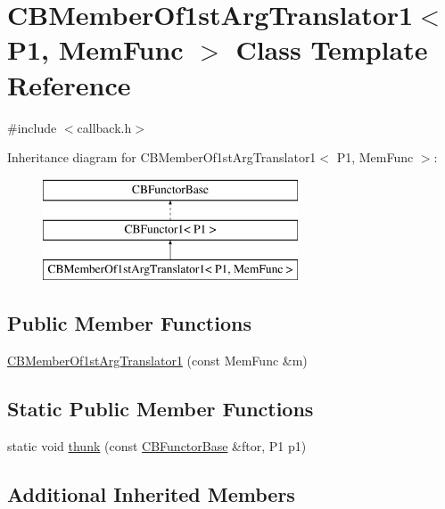 \hypertarget{class_c_b_member_of1st_arg_translator1}{\section{C\+B\+Member\+Of1st\+Arg\+Translator1$<$ P1, Mem\+Func $>$ Class Template Reference}
\label{class_c_b_member_of1st_arg_translator1}
}


{\ttfamily \#include $<$callback.\+h$>$}

Inheritance diagram for C\+B\+Member\+Of1st\+Arg\+Translator1$<$ P1, Mem\+Func $>$\+:\begin{figure}[H]
\begin{center}
\leavevmode
\includegraphics[height=3.000000cm]{class_c_b_member_of1st_arg_translator1}
\end{center}
\end{figure}
\subsection*{Public Member Functions}
\begin{DoxyCompactItemize}
\item 
\hyperlink{class_c_b_member_of1st_arg_translator1_ab49120b3b5bff2dd8e6d4ffedf37d9be}{C\+B\+Member\+Of1st\+Arg\+Translator1} (const Mem\+Func \&m)
\end{DoxyCompactItemize}
\subsection*{Static Public Member Functions}
\begin{DoxyCompactItemize}
\item 
static void \hyperlink{class_c_b_member_of1st_arg_translator1_a8d0d7551febbaad74a7b5871e13ec5aa}{thunk} (const \hyperlink{class_c_b_functor_base}{C\+B\+Functor\+Base} \&ftor, P1 p1)
\end{DoxyCompactItemize}
\subsection*{Additional Inherited Members}


